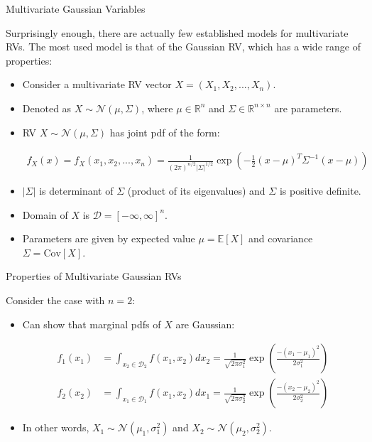 \documentclass[handout,9pt]{beamer}
\begin{document}
%
\begin{frame}{Multivariate Gaussian Variables}

Surprisingly enough, there are actually few established models for multivariate RVs.  The most used model is that of the Gaussian RV, which has a wide range of properties:

\begin{itemize}
\setlength{\itemsep}{10pt}
\item Consider a multivariate RV vector $X=(X_1,X_2,...,X_n)$.

\item Denoted as $X\sim \mathcal{N}(\mu,\Sigma)$, where $\mu\in \mathbb{R}^n$ and $\Sigma\in \mathbb{R}^{n\times n}$ are parameters. 

\item RV $X\sim \mathcal{N}(\mu,\Sigma)$ has joint pdf of the form:
\begin{block}{}
\begin{align*}
f_X(x)=f_X(x_1,x_2,...,x_n)=\frac{1}{(2\pi)^{n/2}|\Sigma|^{1/2}}\exp\left(-\frac{1}{2}(x-\mu)^T\Sigma^{-1}(x-\mu)\right)
\end{align*}
\end{block}
\item $|\Sigma|$ is determinant of  $\Sigma$ (product of its eigenvalues) and $\Sigma$ is positive definite. 

\item Domain of $X$ is $\mathcal{D}=[-\infty,\infty]^n$. 

\item Parameters are given by expected value $\mu=\mathbb{E}[X]$ and covariance $\Sigma=\textrm{Cov}[X]$.

\end{itemize}

\end{frame}

%
\begin{frame}{Properties of Multivariate Gaussian RVs}

Consider the case with $n=2$:
\begin{itemize}
\setlength{\itemsep}{10pt}
\item Can show that marginal pdfs of $X$ are Gaussian:
\begin{block}{}
\begin{align*}
f_1(x_1)&=\int_{x_2\in \mathcal{D}_2}f(x_1,x_2)dx_2=\frac{1}{\sqrt{2\pi\sigma_1^2}}\exp \left({\frac{-(x_1-\mu_1)^2}{2\sigma_1^2}}\right)\\
f_2(x_2)&=\int_{x_1\in \mathcal{D}_1}f(x_1,x_2)dx_1=\frac{1}{\sqrt{2\pi\sigma_2^2}}\exp \left({\frac{-(x_2-\mu_2)^2}{2\sigma_2^2}}\right)
\end{align*} 
\end{block}
\item In other words, $X_1\sim\mathcal{N}(\mu_1,\sigma_1^2)$ and $X_2\sim\mathcal{N}(\mu_2,\sigma_2^2)$.
\end{itemize}
\end{frame}
\end{document}
